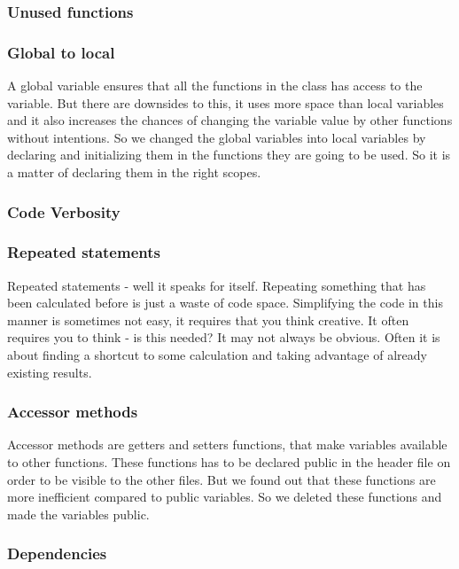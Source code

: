 \subsubsection{Unused functions}

\subsubsection{Global to local}
A global variable ensures that all the
functions in the class has access to the variable. But there are downsides
to this, it uses more space than local variables and it also increases the chances
of changing the variable value by other functions without intentions. So we changed
the global variables into local variables by declaring and initializing them in the
functions they are going to be used. So it is a matter of declaring them in the right
scopes.

\subsubsection{Code Verbosity}

\subsubsection{Repeated statements }
Repeated statements - well it speaks for itself. Repeating something that has been calculated
before is just a waste of code space. Simplifying the code in this manner is sometimes
not easy, it requires that you think creative. It often requires you to think - is this
needed? It may not always be obvious. Often it is about finding a shortcut to some
calculation and taking advantage of already existing results.

\subsubsection{Accessor methods}
Accessor methods are getters and setters functions, that make
variables available to other functions. These functions has to
be declared public in the header file on order to be visible to the
other files. But we found out that these functions are more inefficient
compared to public variables. So we deleted these functions
and made the variables public.

\subsubsection{Dependencies}

